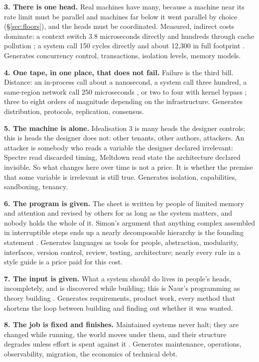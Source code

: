 \documentclass[11pt,oneside]{article}
\theoremstyle{definition}
\theoremstyle{remark}
\begin{document}
\textbf{3. There is one head.} Real machines have many, because a machine near its rate
limit must be parallel and machines far below it went parallel by choice
(\S\ref{sec:floors}), and the heads must be coordinated. Measured, indirect costs dominate: a
context switch 3.8 microseconds directly and hundreds through cache pollution
\cite{li2007}; a system call 150 cycles directly and about 12,300 in full footprint
\cite{soares2010}. Generates concurrency control, transactions, isolation levels, memory
models.

\textbf{4. One tape, in one place, that does not fail.} Failure is the third bill.
Distance: an in-process call about a nanosecond, a system call three hundred, a
same-region network call 250 microseconds \cite{napkinmath}, or two to four with kernel
bypass \cite{kalia2019}; three to eight orders of magnitude depending on the
infrastructure.
Generates distribution, protocols,
replication, consensus.

\textbf{5. The machine is alone.} Idealisation 3 is many heads the designer controls; this
is heads the designer does not: other tenants, other authors, attackers. An attacker is
somebody who reads a variable the designer declared irrelevant: Spectre read discarded
timing, Meltdown read state the architecture declared invisible. So what changes here over
time is not a price. It is whether the premise that some variable is irrelevant is still
true. Generates isolation, capabilities, sandboxing, tenancy.

\textbf{6. The program is given.} The sheet is written by people of limited memory and
attention and revised by others for as long as the system matters, and nobody holds the
whole of it. Simon's argument that anything complex assembled in interruptible steps ends
up a nearly decomposable hierarchy is the founding statement \cite{simon1962}. Generates
languages as tools for people, abstraction, modularity, interfaces, version control,
review, testing, architecture; nearly every rule in a style guide is a price paid for this
cost.

\textbf{7. The input is given.} What a system should do lives in people's heads,
incompletely, and is discovered while building; this is Naur's programming as theory
building \cite{naur1985}. Generates requirements, product work, every method that
shortens the loop between building and finding out whether it was wanted.

\textbf{8. The job is fixed and finishes.} Maintained systems never halt; they are changed
while running, the world moves under them, and their structure degrades unless effort is
spent against it \cite{lehman1980}. Generates maintenance, operations, observability,
migration, the economics of technical debt.
\end{document}

